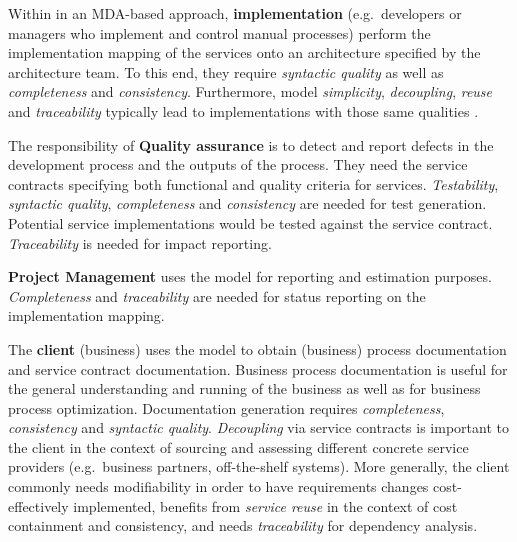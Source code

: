 Within in an MDA-based approach, {\bf implementation} (e.g.\ developers or managers who implement and control manual processes) perform the implementation mapping of the services onto an architecture specified by the architecture team. To this end, they require \emph{syntactic quality} as well as \emph{completeness} and \emph{consistency}. Furthermore, model \emph{simplicity}, \emph{decoupling}, \emph{reuse} and \emph{traceability} typically lead to implementations with those same qualities \cite{podgorelec_estimating_2007}.

The responsibility of {\bf Quality assurance} is to detect and report defects in the development process and the outputs of the process. They need the service contracts specifying both functional and quality criteria for services. \emph{Testability}, \emph{syntactic quality}, \emph{completeness} and \emph{consistency} are needed for test generation. Potential service implementations would be tested against the service contract. \emph{Traceability} is needed for impact reporting.

{\bf Project Management} uses the model for reporting and estimation purposes. \emph{Completeness} and \emph{traceability} are needed for status reporting on the implementation mapping.

The {\bf client} (business) uses the model to obtain (business) process documentation and service contract documentation. Business process documentation is useful for the general understanding and running of the business as well as for business process optimization. Documentation generation requires \emph{completeness}, \emph{consistency} and \emph{syntactic quality}. \emph{Decoupling} via service contracts is important to the client in the context of sourcing and assessing different concrete service providers (e.g.\ business partners, off-the-shelf systems). More generally, the client commonly needs modifiability in order to have requirements changes cost-effectively implemented, benefits from \emph{service reuse} in the context of cost containment and consistency, and needs \emph{traceability} for dependency analysis.

